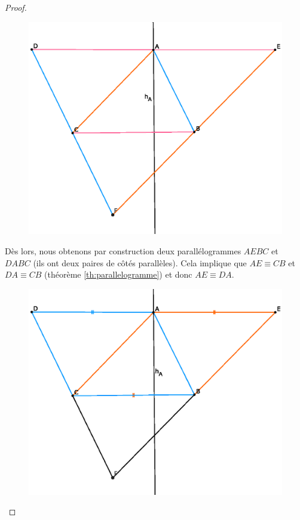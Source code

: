 \documentclass[a4paper,12pt]{article}
\begin{document}
\begin{proof}
\begin{figure}[H]
        \centering
        \includegraphics[scale=0.7]{hauteur2.eps}
    \end{figure}
    
    
Dès lors, nous obtenons par construction deux parallélogrammes $AEBC$ et $DABC$ (ils ont deux paires de côtés parallèles). Cela implique que $AE \equiv CB$ et $DA \equiv CB$ (théorème \ref{th:parallelogramme}) et donc $AE \equiv DA$. 

\begin{figure}[H]
        \centering
        \includegraphics[scale=0.7]{hauteur3.eps}
    \end{figure}


\end{proof}
\end{document}
